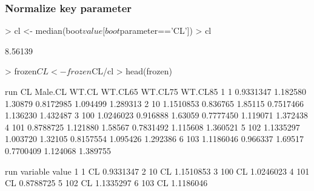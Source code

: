 \subsubsection{Normalize key parameter}
\begin{Schunk}
\begin{Sinput}
> cl <- median(boot$value[boot$parameter=='CL'])
> cl
\end{Sinput}
\begin{Soutput}
[1] 8.56139
\end{Soutput}
\begin{Sinput}
> frozen$CL <- frozen$CL/cl
> head(frozen)
\end{Sinput}
\begin{Soutput}
  run        CL  Male.CL   WT.CL   WT.CL65  WT.CL75  WT.CL85
1   1 0.9331347 1.182580 1.30879 0.8172985 1.094499 1.289313
2  10 1.1510853 0.836765 1.85115 0.7517466 1.136230 1.432487
3 100 1.0246023 0.916888 1.63059 0.7777450 1.119071 1.372438
4 101 0.8788725 1.121880 1.58567 0.7831492 1.115608 1.360521
5 102 1.1335297 1.003720 1.32105 0.8157554 1.095426 1.292386
6 103 1.1186046 0.966337 1.69517 0.7700409 1.124068 1.389755
\end{Soutput}
\begin{Soutput}
  run variable     value
1   1       CL 0.9331347
2  10       CL 1.1510853
3 100       CL 1.0246023
4 101       CL 0.8788725
5 102       CL 1.1335297
6 103       CL 1.1186046
\end{Soutput}
\end{Schunk}
